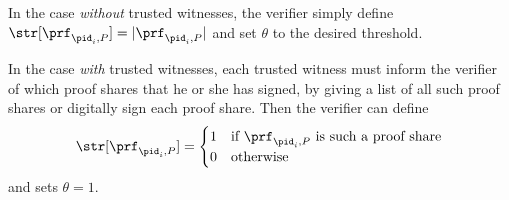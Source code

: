 In the case \emph{without} trusted witnesses, the verifier simply define 
\(\str[\prf_{\pid_i, P}] = |\prf_{\pid_i, P}|\) and set \(\theta\) to the 
desired threshold.

In the case \emph{with} trusted witnesses, each trusted witness must inform the 
verifier of which proof shares that he or she has signed, \eg by giving a list 
of all such proof shares or digitally sign each proof share.
Then the verifier can define \[
  \str[\prf_{\pid_i, P}] = \begin{cases}
    1 & \text{if \(\prf_{\pid_i, P}\) is such a proof share} \\
    0 & \text{otherwise}
  \end{cases}
\] and sets \(\theta = 1\).

